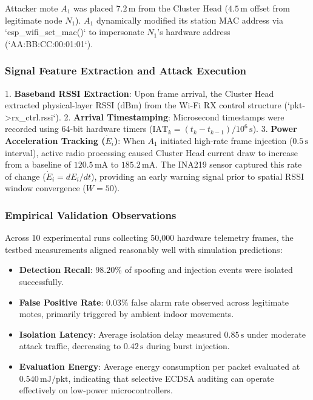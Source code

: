 \documentclass[conference]{IEEEtran}
\begin{document}
Attacker mote $A_1$ was placed $7.2\,\text{m}$ from the Cluster Head ($4.5\,\text{m}$ offset from legitimate node $N_1$). $A_1$ dynamically modified its station MAC address via `esp_wifi_set_mac()` to impersonate $N_1$'s hardware address (`AA:BB:CC:00:01:01`).

\subsubsection{Signal Feature Extraction and Attack Execution}
1. \textbf{Baseband RSSI Extraction}: Upon frame arrival, the Cluster Head extracted physical-layer RSSI ($\text{dBm}$) from the Wi-Fi RX control structure (`pkt->rx_ctrl.rssi`).
2. \textbf{Arrival Timestamping}: Microsecond timestamps were recorded using 64-bit hardware timers ($\text{IAT}_k = (t_k - t_{k-1})/10^6\,\text{s}$).
3. \textbf{Power Acceleration Tracking ($\dot{E}_i$)}: When $A_1$ initiated high-rate frame injection ($0.5\,\text{s}$ interval), active radio processing caused Cluster Head current draw to increase from a baseline of $120.5\,\text{mA}$ to $185.2\,\text{mA}$. The INA219 sensor captured this rate of change ($\dot{E}_i = dE_i/dt$), providing an early warning signal prior to spatial RSSI window convergence ($W=50$).

\subsubsection{Empirical Validation Observations}
Across 10 experimental runs collecting 50,000 hardware telemetry frames, the testbed measurements aligned reasonably well with simulation predictions:
\begin{itemize}
    \item \textbf{Detection Recall}: $98.20\%$ of spoofing and injection events were isolated successfully.
    \item \textbf{False Positive Rate}: $0.03\%$ false alarm rate observed across legitimate motes, primarily triggered by ambient indoor movements.
    \item \textbf{Isolation Latency}: Average isolation delay measured $0.85\,\text{s}$ under moderate attack traffic, decreasing to $0.42\,\text{s}$ during burst injection.
    \item \textbf{Evaluation Energy}: Average energy consumption per packet evaluated at $0.540\,\text{mJ/pkt}$, indicating that selective ECDSA auditing can operate effectively on low-power microcontrollers.
\end{itemize}
\end{document}
